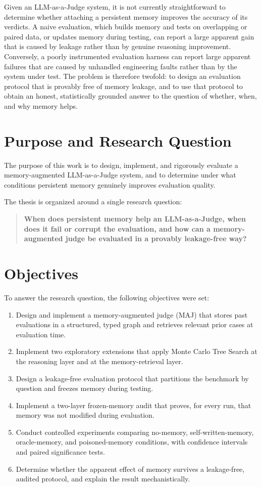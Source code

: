 \documentclass[14pt,a4paper]{extreport}
\begin{document}
Given an LLM-as-a-Judge system, it is not currently straightforward to determine whether attaching a persistent memory improves the accuracy of its verdicts. A naive evaluation, which builds memory and tests on overlapping or paired data, or updates memory during testing, can report a large apparent gain that is caused by leakage rather than by genuine reasoning improvement. Conversely, a poorly instrumented evaluation harness can report large apparent failures that are caused by unhandled engineering faults rather than by the system under test. The problem is therefore twofold: to design an evaluation protocol that is provably free of memory leakage, and to use that protocol to obtain an honest, statistically grounded answer to the question of whether, when, and why memory helps.

\section{Purpose and Research Question}

The purpose of this work is to design, implement, and rigorously evaluate a memory-augmented LLM-as-a-Judge system, and to determine under what conditions persistent memory genuinely improves evaluation quality.

The thesis is organized around a single research question:

\begin{quote}
\textbf{When does persistent memory help an LLM-as-a-Judge, when does it fail or corrupt the evaluation, and how can a memory-augmented judge be evaluated in a provably leakage-free way?}
\end{quote}

\section{Objectives}

To answer the research question, the following objectives were set:

\begin{enumerate}
    \item Design and implement a memory-augmented judge (MAJ) that stores past evaluations in a structured, typed graph and retrieves relevant prior cases at evaluation time.
    \item Implement two exploratory extensions that apply Monte Carlo Tree Search at the reasoning layer and at the memory-retrieval layer.
    \item Design a leakage-free evaluation protocol that partitions the benchmark by question and freezes memory during testing.
    \item Implement a two-layer frozen-memory audit that proves, for every run, that memory was not modified during evaluation.
    \item Conduct controlled experiments comparing no-memory, self-written-memory, oracle-memory, and poisoned-memory conditions, with confidence intervals and paired significance tests.
    \item Determine whether the apparent effect of memory survives a leakage-free, audited protocol, and explain the result mechanistically.
\end{enumerate}
\end{document}
